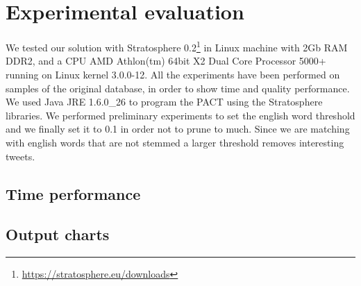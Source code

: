 \section{Experimental evaluation}
\label{sec:results}
We tested our solution with Stratosphere 0.2\footnote{\url{https://stratosphere.eu/downloads}} in Linux machine with 2Gb RAM DDR2, and a CPU AMD Athlon(tm) 64bit X2 Dual Core Processor 5000+ running on Linux kernel 3.0.0-12. 
All the experiments have been performed on samples of the original database, in order to show time and quality performance. 
We used Java JRE 1.6.0\_26 to program the PACT using the Stratosphere libraries. 
We performed preliminary experiments to set the english word threshold and we finally set it to 0.1 in order not to prune to much. 
Since we are matching with english words that are not stemmed a larger threshold removes interesting tweets.  

\subsection{Time performance}

\subsection{Output charts}
